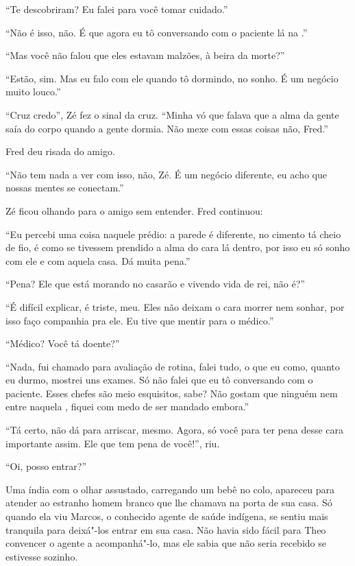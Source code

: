 ``Te descobriram? Eu falei para você tomar cuidado.''

``Não é isso, não. É que agora eu tô conversando com o paciente lá na
.''

``Mas você não falou que eles estavam malzões, à beira da morte?''

``Estão, sim. Mas eu falo com ele quando tô dormindo, no sonho. É um
negócio muito louco.''

``Cruz credo'', Zé fez o sinal da cruz. ``Minha vó que falava que a
alma da gente saía do corpo quando a gente dormia. Não mexe com essas
coisas não, Fred.''

Fred deu risada do amigo.

``Não tem nada a ver com isso, não, Zé. É um negócio diferente, eu acho
que nossas mentes se conectam.''

Zé ficou olhando para o amigo sem entender. Fred continuou:

``Eu percebi uma coisa naquele prédio: a parede é diferente, no cimento
tá cheio de fio, é como se tivessem prendido a alma do cara lá dentro,
por isso eu só sonho com ele e com aquela casa. Dá muita pena.''

``Pena? Ele que está morando no casarão e vivendo vida de rei, não é?''

``É difícil explicar, é triste, meu. Eles não deixam o cara morrer nem
sonhar, por isso faço companhia pra ele. Eu tive que mentir para o
médico.''

``Médico? Você tá doente?''

``Nada, fui chamado para avaliação de rotina, falei tudo, o que eu como,
quanto eu durmo, mostrei uns exames. Só não falei que eu tô conversando
com o paciente. Esses chefes são meio esquisitos, sabe? Não gostam que
ninguém nem entre naquela , fiquei com medo de ser mandado embora.''

``Tá certo, não dá para arriscar, mesmo. Agora, só você para
ter pena desse cara importante assim. Ele que tem pena de você!'', riu.

\asterisc


``Oi, posso entrar?''

Uma índia com o olhar assustado, carregando um bebê no colo, apareceu
para atender ao estranho homem branco que lhe chamava na porta de sua
casa. Só quando ela viu Marcos, o conhecido agente de saúde indígena,
se sentiu mais tranquila para deixá"-los entrar em sua
casa. Não havia sido fácil para Theo convencer o agente a acompanhá"-lo,
mas ele sabia que não seria recebido se estivesse sozinho.

